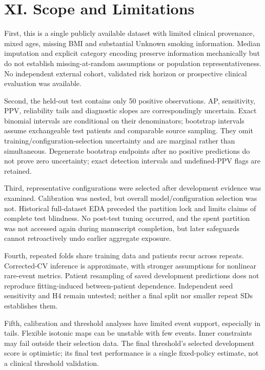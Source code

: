 \documentclass[10pt,twocolumn,letterpaper]{article}
\begin{document}
\section*{XI. Scope and Limitations}
First, this is a single publicly available dataset with limited clinical provenance, mixed ages, missing BMI and substantial Unknown smoking information. Median imputation and explicit category encoding preserve information mechanically but do not establish missing-at-random assumptions or population representativeness. No independent external cohort, validated risk horizon or prospective clinical evaluation was available.


Second, the held-out test contains only 50 positive observations. AP, sensitivity, PPV, reliability tails and diagnostic slopes are correspondingly uncertain. Exact binomial intervals are conditional on their denominators; bootstrap intervals assume exchangeable test patients and comparable source sampling. They omit training/configuration-selection uncertainty and are marginal rather than simultaneous. Degenerate bootstrap endpoints after no positive predictions do not prove zero uncertainty; exact detection intervals and undefined-PPV flags are retained.


Third, representative configurations were selected after development evidence was examined. Calibration was nested, but overall model/configuration selection was not. Historical full-dataset EDA preceded the partition lock and limits claims of complete test blindness. No post-test tuning occurred, and the spent partition was not accessed again during manuscript completion, but later safeguards cannot retroactively undo earlier aggregate exposure.


Fourth, repeated folds share training data and patients recur across repeats. Corrected-CV inference is approximate, with stronger assumptions for nonlinear rare-event metrics. Patient resampling of saved development predictions does not reproduce fitting-induced between-patient dependence. Independent seed sensitivity and H4 remain untested; neither a final split nor smaller repeat SDs establishes them.


Fifth, calibration and threshold analyses have limited event support, especially in tails. Flexible isotonic maps can be unstable with few events. Inner constraints may fail outside their selection data. The final threshold's selected development score is optimistic; its final test performance is a single fixed-policy estimate, not a clinical threshold validation.
\end{document}
